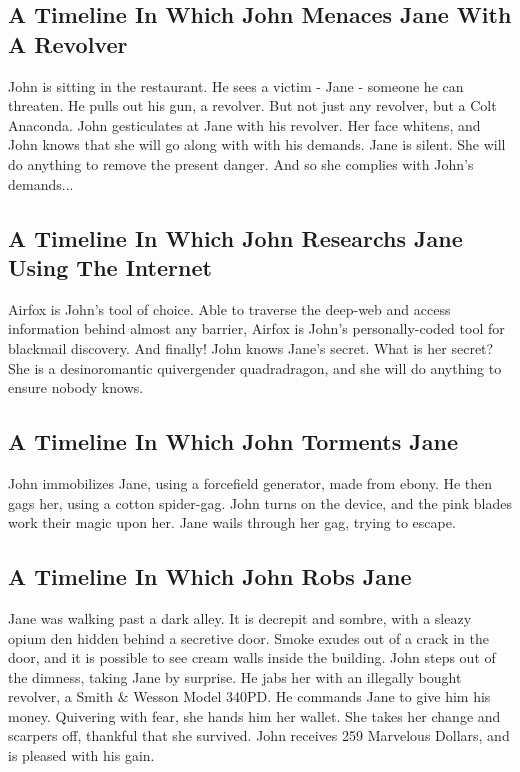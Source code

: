 \documentclass{article}
\begin{document}
\subsection{A Timeline In Which John Menaces Jane With A Revolver}


John is sitting in the restaurant.
He sees a victim {-} Jane {-} someone he can threaten. He pulls out his gun, a revolver.
But not just any revolver, but a Colt Anaconda.
John gesticulates at Jane with his revolver. Her face whitens, and John knows that she will go along with with his demands.
Jane is silent. She will do anything to remove the present danger. And so she complies with John's demands...
\subsection{A Timeline In Which John Researchs Jane Using The Internet}


Airfox is John's tool of choice. Able to traverse the deep{-}web and access information behind almost any barrier, Airfox is John's personally{-}coded tool for blackmail discovery.
And finally!
John knows Jane's secret. What is her secret? She is a desinoromantic quivergender quadradragon, and she will do anything to ensure nobody knows.
\subsection{A Timeline In Which John Torments Jane}


John immobilizes Jane, using a forcefield generator, made from ebony.
He then gags her, using a cotton spider{-}gag.
John turns on the device, and the pink blades work their magic upon her.
Jane wails through her gag, trying to escape.
\subsection{A Timeline In Which John Robs Jane}


Jane was walking past a dark alley.
It is decrepit and sombre, with a sleazy opium den hidden behind a secretive door.
Smoke exudes out of a crack in the door, and it is possible to see cream walls inside the building.
John steps out of the dimness, taking Jane by surprise.
He jabs her with an illegally bought revolver, a Smith \& Wesson Model 340PD.
He commands Jane to give him his money.
Quivering with fear, she hands him her wallet.
She takes her change and scarpers off, thankful that she survived.
John receives 259 Marvelous Dollars, and is pleased with his gain.
\end{document}
